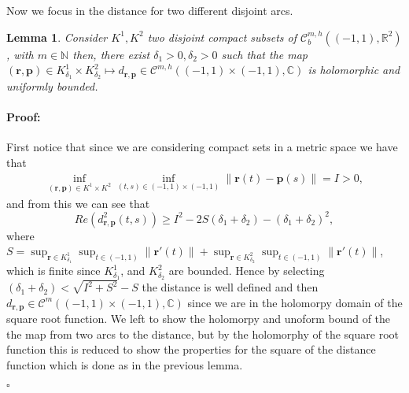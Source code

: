 \documentclass{article}
\newtheorem{lemma}[theorem]{Lemma}
\newenvironment{proof}{\paragraph{Proof:}}{\hfill$\square$}
\newcommand{\IC}{{\mathbb C}}
\newcommand{\IN}{{\mathbb N}}
\newcommand{\IR}{{\mathbb R}}
\newcommand{\bp}{{\bm p}}
\newcommand{\cmspace}[3]{\mathcal{C}^{#1} \left( #2, #3 \right)}
\newcommand{\cmspaceh}[4]{\mathcal{C}^{#1,#2} \left( #3, #4 \right)}
\newcommand{\rgeoh}[2]{\mathcal{C}_b^{#1,#2}\left( (-1,1), \IR^2 \right)}
\newcommand{\bh}{\bm{h}}
\newcommand{\br}{\bm{r}}
\begin{document}
Now we focus in the distance for two different disjoint arcs. 
\begin{lemma}
\label{lemma:dcross}
Consider $K^1,K^2$ two disjoint compact subsets of $\rgeoh{m}{h}$, with  $m \in \IN$
then, there exist $\delta_1 >0 , \delta_2 >0$ such that the map $(\br, \bp) \in K^1_{\delta_1} \times K^2_{\delta_2} \mapsto d_{\br, \bp} \in \cmspaceh{m}{h}{(-1,1)\times(-1,1)}{\IC}$ is holomorphic and uniformly bounded. 
\end{lemma}
\begin{proof}
First notice that since we are considering compact sets in a metric space we have that
\begin{align*}
\inf_{(\br,\bp) \in K^1 \times K^2} \inf_{(t,s) \in (-1,1)\times(-1,1)}
 \| \br(t) - \bp(s) \| = I > 0,
\end{align*}
and from this we can see that
$$
Re(d_{\br,\bp}^2(t,s)) \geq I^2 -2 S(\delta_1 + \delta_2) - ( \delta_1 + \delta_2)^2,$$
where $S = \sup_{\br \in K^1_{\delta_1}} \sup_{t \in (-1,1)} \| \br'(t)\| +
\sup_{\br \in K^2_{\delta_2}} \sup_{t \in (-1,1)} \| \br'(t)\|$, which is finite since $K^1_{\delta_1}$, and $K^2_{\delta_2}$ are bounded. Hence by selecting $(\delta_1+\delta_2) < \sqrt{I^2+S^2}-S$ the distance is well defined and then $d_{\br, \bp } \in \cmspace{m}{(-1,1)\times (-1,1)}{\IC}$ since we are in the holomorpy domain of the square root function. We left to show the holomorpy  and unoform bound of the the map from two arcs to the distance, but by the holomorphy of the square root function this is reduced to show the properties for the square of the distance function which is done as in the previous lemma. 

\end{proof}
\end{document}
